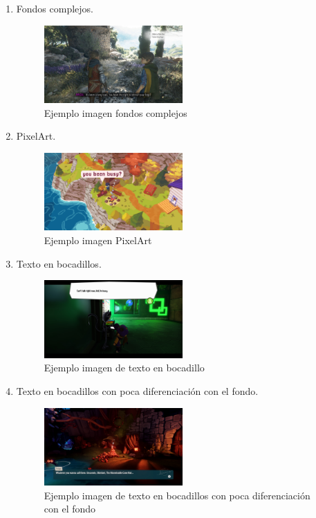 \begin{enumerate}
	\item Fondos complejos.
		\begin{figure}[H]
		\centering
		\includegraphics[width = 0.5\textwidth]{Imagenes/OCR/Complejo.png}
		\caption{Ejemplo imagen fondos complejos }
	\end{figure}
	\item PixelArt.
		\begin{figure}[H]
		\centering
		\includegraphics[width = 0.5\textwidth]{Imagenes/OCR/Pixel.png}
		\caption{Ejemplo imagen PixelArt }
	\end{figure}
	\item Texto en bocadillos.
		\begin{figure}[H]
		\centering
		\includegraphics[width = 0.5\textwidth]{Imagenes/OCR/Boc.png}
		\caption{Ejemplo imagen de texto en bocadillo }
	\end{figure}
	\item Texto en bocadillos con poca diferenciación con el fondo.
		\begin{figure}[H]
		\centering
		\includegraphics[width = 0.5\textwidth]{Imagenes/OCR/Boc2.png}
		\caption{Ejemplo imagen de texto en bocadillos con poca diferenciación con el fondo }
	\end{figure}
\end{enumerate} 


